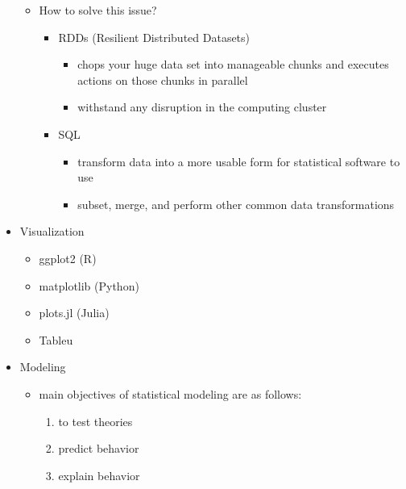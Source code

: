 \documentclass{article}
\begin{document}
\begin{itemize}
\begin{itemize}
        \item How to solve this issue?
            \begin{itemize}
                \item RDDs (Resilient Distributed Datasets)
                    \begin{itemize}
                        \item chops your huge data set into manageable chunks and executes actions on those chunks in parallel
                        \item withstand any disruption in the computing cluster
                    \end{itemize}
                \item SQL
                    \begin{itemize}
                        \item transform data into a more usable form for statistical software to use
                        \item subset, merge, and perform other common data transformations
                    \end{itemize}
            \end{itemize}
    \end{itemize}
\item Visualization
    \begin{itemize}
        \item ggplot2 (R)
        \item matplotlib (Python)
        \item plots.jl (Julia)
        \item Tableu
    \end{itemize}
\item Modeling
    \begin{itemize}
        \item main objectives of statistical modeling are as follows:
            \begin{enumerate}
                \item to test theories
                \item predict behavior
                \item explain behavior
            \end{enumerate}
    \end{itemize}
\end{itemize}
\end{document}
